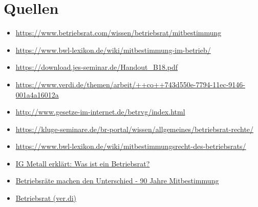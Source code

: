 \documentclass[
  a4paper,            %
  DIV=10,             %
  oneside,            %
  BCOR=5mm,           %
  parskip=half,       %
  numbers=noenddot    %
]{scrartcl}
\begin{document}
\section{Quellen}
   \begin{itemize}
   	\item 
   	\url{https://www.betriebsrat.com/wissen/betriebsrat/mitbestimmung}
   	\item  
   	\url{https://www.bwl-lexikon.de/wiki/mitbestimmung-im-betrieb/}
   	\item
   	\url{https://download.jes-seminar.de/Handout_B18.pdf}
	\item 
	\url{https://www.verdi.de/themen/arbeit/++co++743d550e-7794-11ec-9146-001a4a16012a}
	\item
	\url{http://www.gesetze-im-internet.de/betrvg/index.html} 
	\item 
	\url{https://kluge-seminare.de/br-portal/wissen/allgemeines/betriebsrat-rechte/}
	\item 
	\url{https://www.bwl-lexikon.de/wiki/mitbestimmungsrecht-des-betriebsrats/}
	\item 
	\href{https://youtu.be/aPiJ-byyQyU}{IG Metall erklärt: Was ist ein Betriebsrat?}
	\item
	\href{https://youtu.be/7nTdul3NSA4}{Betriebsräte machen den Unterschied - 90 Jahre Mitbestimmung}
	\item
	\href{https://youtu.be/MrKcdzwGqcw}{Betriebsrat (ver.di)}
\end{itemize}

%
%

\clearpage
\end{document}

